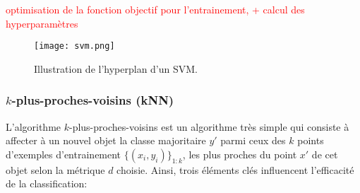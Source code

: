 \textcolor{red}{optimisation de la fonction objectif pour l'entrainement, + calcul des hyperparamètres}

\begin{figure}[!htb]
	\centering
	\texttt{[image: svm.png]}
	\caption{Illustration de l'hyperplan d'un SVM.}\label{fig:sensresultat:svm}
\end{figure}

\subsubsection{$k$-plus-proches-voisins (kNN)}
L'algorithme $k$-plus-proches-voisins est un algorithme très simple qui consiste à affecter à un nouvel objet la classe majoritaire $y'$ parmi ceux des $k$ points d'exemples d'entrainement $\lbrace (x_i,y_i) \rbrace_{1:k}$, les plus proches du point $x'$ de cet objet selon la métrique $d$ choisie. Ainsi, trois éléments clés influencent l'efficacité de la classification:
